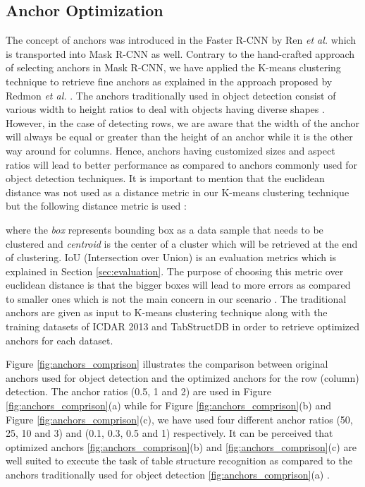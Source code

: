 \documentclass{ieeeaccess}
\begin{document}
\subsection{Anchor Optimization}
The concept of anchors was introduced in the Faster R-CNN by Ren \textit{et al.} \cite{b34} which is transported into Mask R-CNN \cite{b36} as well. Contrary to the hand-crafted approach of selecting anchors in Mask R-CNN, we have applied the K-means clustering technique to retrieve fine anchors as explained in the approach proposed by Redmon \textit{et al.} \cite{b51}. The anchors traditionally used in object detection consist of various width to height ratios to deal with objects having diverse shapes \cite{b63}. However, in the case of detecting rows, we are aware that the width of the anchor will always be equal or greater than the height of an anchor while it is the other way around for columns. Hence, anchors having customized sizes and aspect ratios will lead to better performance as compared to anchors commonly used for object detection techniques. It is important to mention that the euclidean distance  was not used as a distance metric in our K-means clustering technique but the following distance metric \cite{b56} is used :



where the \textit{box} represents bounding box as a data sample that needs to be clustered and \textit{centroid} is the center of a cluster which will be retrieved at the end of clustering. IoU (Intersection over Union) is an evaluation metrics which is explained in Section \ref{sec:evaluation}. The purpose of choosing this metric over euclidean distance is that the bigger boxes will lead to more errors as compared to smaller ones which is not the main concern in our scenario \cite{b56}. The traditional anchors are given as input to K-means clustering technique along with the training datasets of ICDAR 2013 \cite{b18} and TabStructDB  \cite{b33} in order to retrieve optimized anchors for each dataset. 

Figure \ref{fig:anchors_comprison} illustrates the comparison between original anchors used for object detection and the optimized anchors for the row (column) detection. The anchor ratios (0.5, 1 and 2) are used in Figure \ref{fig:anchors_comprison}(a) while for Figure \ref{fig:anchors_comprison}(b) and Figure \ref{fig:anchors_comprison}(c), we have used four different anchor ratios (50, 25, 10 and 3) and (0.1, 0.3, 0.5 and 1) respectively. It can be perceived that optimized anchors \ref{fig:anchors_comprison}(b) and \ref{fig:anchors_comprison}(c)  are well suited to execute the task of table structure recognition as compared to the anchors traditionally used for object detection \ref{fig:anchors_comprison}(a) .
\end{document}
